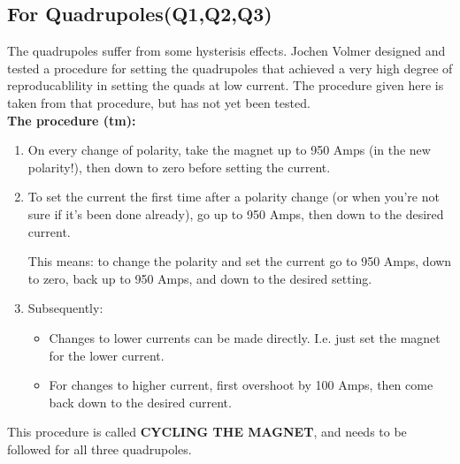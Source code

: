 \documentclass[12pt,epsf,here]{article}
\begin{document}
\subsection{For Quadrupoles(Q1,Q2,Q3)}

The quadrupoles suffer from some hysterisis effects. Jochen Volmer designed 
and tested a procedure for setting the quadrupoles that achieved a very 
high degree of reproducablility in setting the quads at low current. 
The procedure given here is taken from that procedure, but has not yet 
been tested.\\
\textbf{The procedure (tm):}
\begin{enumerate}
	\item{On every change of polarity, take the magnet up to 950 Amps 
	(in the new polarity!), then down to zero before setting the
	current.}
	\item{To set the current the first time after a polarity change 
	(or when you're not sure if it's been done already), 
	go up to 950 Amps, then down to the desired current.
	
	This means: to change the polarity and set the current go to 950 Amps,
	down to zero, back up to 950 Amps, and down to the desired setting.}
	\item{Subsequently:
	\begin{itemize}
		\item{Changes to lower currents can be made directly. 
		I.e. just set the magnet for the lower current.}
		\item{For changes to higher current, first overshoot 
		by 100 Amps, then come back down to the desired current.}
	\end{itemize}}
\end{enumerate}
This procedure is called \textbf{CYCLING THE MAGNET}, and needs to be 
followed for all three quadrupoles.


 
\end{document}
